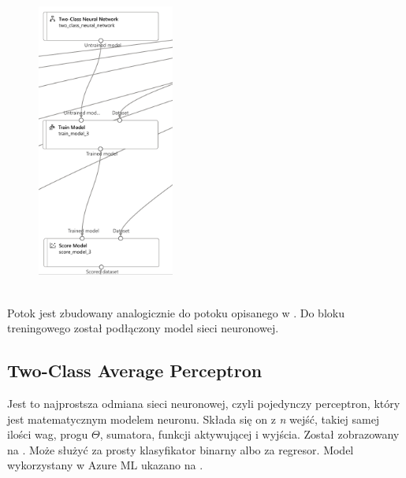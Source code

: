 \begin{figure}[H]
    \centering
    \includegraphics[width=0.4\textwidth]{images/nn_pipe}
    \label{fig:nn-pipe}
\end{figure}
\ \\
Potok jest zbudowany analogicznie do potoku opisanego w . Do bloku treningowego został podłączony model sieci neuronowej.

\subsection{Two-Class Average Perceptron}
Jest to najprostsza odmiana sieci neuronowej, czyli pojedynczy perceptron, który jest matematycznym modelem neuronu. Składa się on z \textit{n} wejść, takiej samej ilości wag, progu $\Theta$, sumatora, funkcji aktywującej i wyjścia. Został zobrazowany na . Może służyć za prosty klasyfikator binarny albo za regresor. Model wykorzystany w Azure ML ukazano na .

